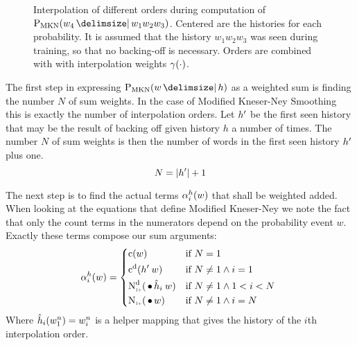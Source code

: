 \begin{figure}
  \centering
  
  \caption{
    Interpolation of different orders during computation of
    $\ProbMKN{w_4}{w_1 w_2 w_3}$.
    Centered are the histories for each probability.
    It is assumed that the history $w_1 w_2 w_3$ was seen during training, so
    that no backing-off is necessary.
    Orders are combined with with interpolation weights $\gamma(\cdot)$.
  }
  \label{fig:history-mkn}
\end{figure}

The first step in expressing $\ProbMKN{w}{h}$ as a weighted sum is finding the
number $N$ of sum weights.
In the case of Modified Kneser-Ney Smoothing this is exactly the number of
interpolation orders.
Let $h^\prime$ be the first seen history that may be the result of backing
off given history $h$ a number of times.
The number $N$ of sum weights is then the number of words in the first seen
history $h^\prime$ plus one.
\begin{equation}
  N = {\left|h^\prime\right|} + 1
\end{equation}

The next step is to find the actual terms $\alpha_i^h(w)$ that shall be
weighted added.
When looking at the equations that define Modified Kneser-Ney we note the fact
that only the count terms in the numerators depend on the probability event $w$.
Exactly these terms compose our sum arguments:
\begin{equation}
  \SumArg_i^h(w) =
    \begin{dcases*}
      \Count(w)                                        & if $N = 1$ \\
      \DiscountedCount(\SeenHistory \: w)              & if $N \neq 1 \land i = 1$ \\
      \DiscountedCount*(\WSkp \DerivedHistory[i] \: w) & if $N \neq 1 \land 1 < i < N$ \\
      \ContCountIp(\WSkp w)                            & if $N \neq 1 \land i = N$
    \end{dcases*}
\end{equation}
Where $\DerivedHistory[i](w_1^n) = w_i^n$ is a helper mapping that gives the history
of the $i$th interpolation order.

